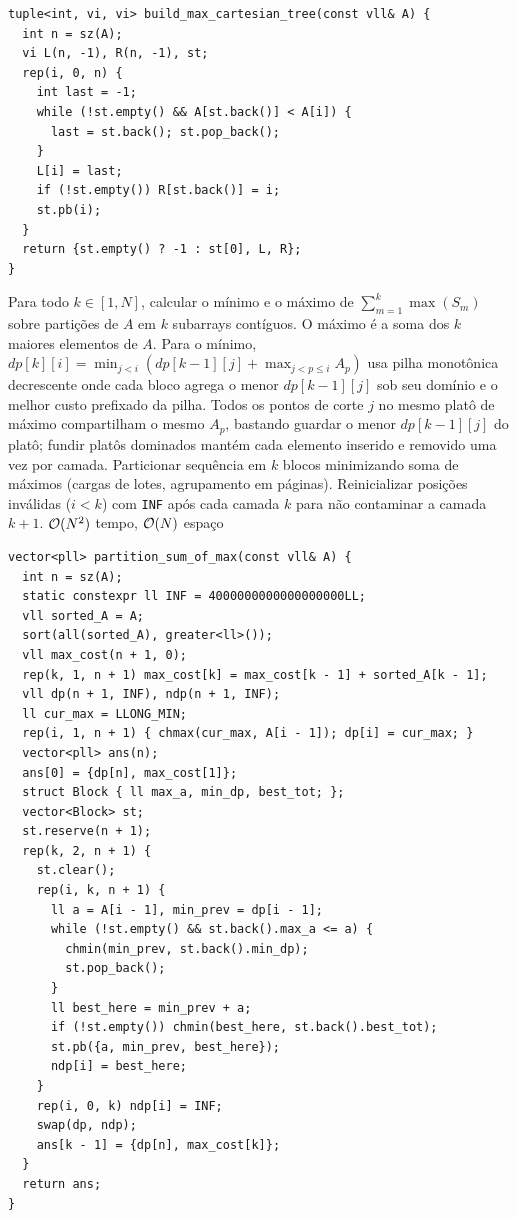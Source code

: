 \begin{lstlisting}
tuple<int, vi, vi> build_max_cartesian_tree(const vll& A) {
  int n = sz(A);
  vi L(n, -1), R(n, -1), st;
  rep(i, 0, n) {
    int last = -1;
    while (!st.empty() && A[st.back()] < A[i]) {
      last = st.back(); st.pop_back();
    }
    L[i] = last;
    if (!st.empty()) R[st.back()] = i;
    st.pb(i);
  }
  return {st.empty() ? -1 : st[0], L, R};
}
\end{lstlisting}

\algobox
  {Para todo $k \in [1, N]$, calcular o mínimo e o máximo de $\sum_{m=1}^k \max(S_m)$ sobre partições de $A$ em $k$ subarrays contíguos.}
  {O máximo é a soma dos $k$ maiores elementos de $A$. Para o mínimo, $dp[k][i] = \min_{j<i}(dp[k-1][j] + \max_{j<p\le i} A_p)$ usa pilha monotônica decrescente onde cada bloco agrega o menor $dp[k-1][j]$ sob seu domínio e o melhor custo prefixado da pilha.}
  {Todos os pontos de corte $j$ no mesmo platô de máximo compartilham o mesmo $A_p$, bastando guardar o menor $dp[k-1][j]$ do platô; fundir platôs dominados mantém cada elemento inserido e removido uma vez por camada.}
  {Particionar sequência em $k$ blocos minimizando soma de máximos (cargas de lotes, agrupamento em páginas).}
  {Reinicializar posições inválidas ($i < k$) com \texttt{INF} após cada camada $k$ para não contaminar a camada $k + 1$.}
  {$\mathcal{O}(N^2)$ tempo, $\mathcal{O}(N)$ espaço}

\begin{lstlisting}
vector<pll> partition_sum_of_max(const vll& A) {
  int n = sz(A);
  static constexpr ll INF = 4000000000000000000LL;
  vll sorted_A = A;
  sort(all(sorted_A), greater<ll>());
  vll max_cost(n + 1, 0);
  rep(k, 1, n + 1) max_cost[k] = max_cost[k - 1] + sorted_A[k - 1];
  vll dp(n + 1, INF), ndp(n + 1, INF);
  ll cur_max = LLONG_MIN;
  rep(i, 1, n + 1) { chmax(cur_max, A[i - 1]); dp[i] = cur_max; }
  vector<pll> ans(n);
  ans[0] = {dp[n], max_cost[1]};
  struct Block { ll max_a, min_dp, best_tot; };
  vector<Block> st;
  st.reserve(n + 1);
  rep(k, 2, n + 1) {
    st.clear();
    rep(i, k, n + 1) {
      ll a = A[i - 1], min_prev = dp[i - 1];
      while (!st.empty() && st.back().max_a <= a) {
        chmin(min_prev, st.back().min_dp);
        st.pop_back();
      }
      ll best_here = min_prev + a;
      if (!st.empty()) chmin(best_here, st.back().best_tot);
      st.pb({a, min_prev, best_here});
      ndp[i] = best_here;
    }
    rep(i, 0, k) ndp[i] = INF;
    swap(dp, ndp);
    ans[k - 1] = {dp[n], max_cost[k]};
  }
  return ans;
}
\end{lstlisting}

